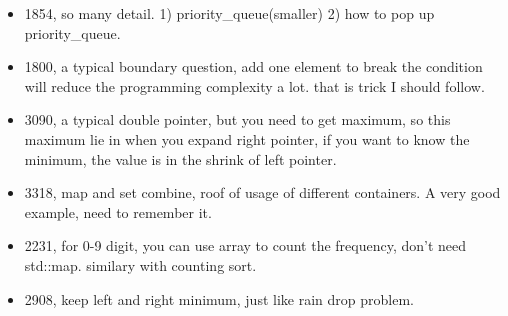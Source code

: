\documentclass[a4paper,11pt,twoside]{book}
\begin{document}
\begin{itemize}
	\item 1854, so many detail. 1) priority\_queue(smaller) 2) how to pop up priority\_queue. 
	
	\item 1800, a typical boundary question, add one element to break the condition will reduce the programming complexity a lot. that is trick I should follow. 
	
	
	\item 3090, a typical double pointer, but you need to get maximum, so this maximum lie in when you expand right pointer, if you want to know the minimum, the value is in the shrink of left pointer. 
	
	\item 3318, map and set combine, roof of usage of different containers.  A very good example, need to remember it. 
	
	\item 2231, for 0-9 digit, you can use array to count the frequency, don't need std::map. similary with counting sort. 
	
	\item 2908, keep left and right minimum, just like rain drop problem. 
	
	
\end{itemize}

	


\end{document}
